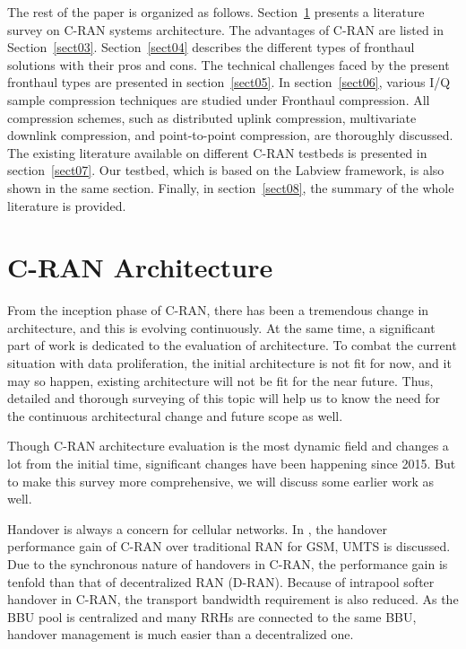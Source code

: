 \begin{multicols}{2}
The rest of the paper is organized as follows. Section~\ref{sect02} presents a literature survey on C-RAN systems architecture. The advantages of C-RAN are listed in Section~\ref{sect03}. Section~\ref{sect04} describes the different types of fronthaul solutions with their pros and cons. The technical challenges faced by the present fronthaul types are presented in section~\ref{sect05}. In section~\ref{sect06}, various I/Q sample compression techniques are studied under Fronthaul compression. All compression schemes, such as distributed uplink compression, multivariate downlink compression, and point-to-point compression, are thoroughly discussed. The existing literature available on different C-RAN testbeds is presented in section~\ref{sect07}. Our testbed, which is based on the Labview framework, is also shown in the same section. Finally, in section~\ref{sect08}, the summary of the whole literature is provided.

\section{C-RAN Architecture}\label{sect02}

From the inception phase of C-RAN, there has been a tremendous change in architecture, and this is evolving continuously. At the same time, a significant part of work is dedicated to the evaluation of architecture. To combat the current situation with data proliferation, the initial architecture is not fit for now, and it may so happen, existing architecture will not be fit for the near future. Thus, detailed and thorough surveying of this topic will help us to know the need for the continuous architectural change and future scope as well.

Though C-RAN architecture evaluation is the most dynamic field and changes a lot from the initial time, significant changes have been happening since 2015. But to make this survey more comprehensive, we will discuss some earlier work as well.

Handover is always a concern for cellular networks. In \cite{art3-key13}, the handover performance gain of C-RAN over traditional RAN for GSM, UMTS is discussed. Due to the synchronous nature of handovers in C-RAN, the performance gain is tenfold than that of decentralized RAN (D-RAN). Because of intrapool softer handover in C-RAN, the transport bandwidth requirement is also reduced. As the BBU pool is centralized and many RRHs are connected to the same BBU, handover management is much easier than a decentralized one.


\end{multicols}
